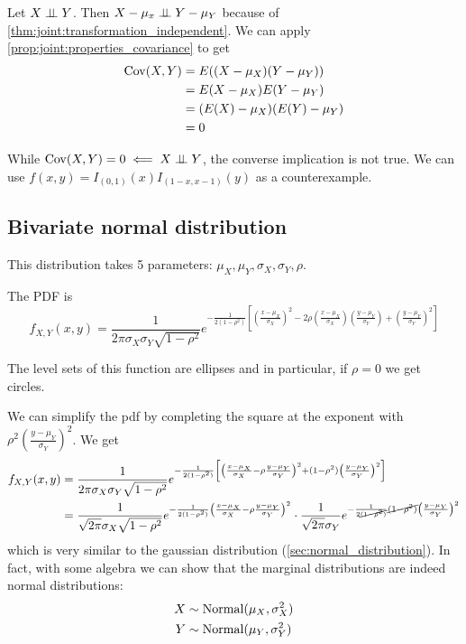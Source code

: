 \documentclass[12pt]{extarticle}
\newcommand{\cov}{{\operatorfont Cov}}
\newcommand{\Normal}{{\operatorfont Normal}}
\begin{document}
\begin{proposition}
    Let $X \perp \!\!\! \perp Y$. Then $X - \mu_x \perp \!\!\! \perp Y -\mu_Y$ because of \autoref{thm:joint:transformation_independent}.
    We can apply \autoref{prop:joint:properties_covariance} to get
    \begin{align}
        \cov(X, Y) & = E((X - \mu_X)(Y - \mu_Y))    \\
                   & = E(X - \mu_X) E(Y - \mu_Y)    \\
                   & = (E(X) - \mu_X)(E(Y) - \mu_Y) \\
                   & = 0
    \end{align}
\end{proposition}

\begin{remark}
    While $\cov(X, Y) = 0 \impliedby X \indep Y$, the converse implication is not true.
    We can use $f(x, y) = I_{(0,1)}(x) I_{(1-x, x-1)}(y)$ as a counterexample.
\end{remark}

\subsection{Bivariate normal distribution}

This distribution takes 5 parameters: $\mu_X, \mu_Y, \sigma_X, \sigma_Y, \rho$.

The PDF is
\begin{equation}
    f_{X,Y}(x,y) = \frac{1}{2 \pi \sigma_X \sigma_Y \sqrt{1- \rho^2}} e^{-\frac{1}{2(1-\rho^2)} \left[ \left( \frac{x - \mu_X}{\sigma_X} \right)^2 -2 \rho \left( \frac{x-\mu_X}{\sigma_X} \right) \left( \frac{y-\mu_Y}{\sigma_Y} \right) + \left(\frac{y-\mu_Y}{\sigma_Y}\right)^2 \right]}
\end{equation}

The level sets of this function are ellipses and in particular, if $\rho = 0$ we get circles.

We can simplify the pdf by completing the square at the exponent with $\rho ^2 \left(\frac{y - \mu_Y}{\sigma_Y}\right)^2$. We get
\begin{align}
    f_{X,Y}(x,y) & = \frac{1}{2 \pi \sigma_X \sigma_Y \sqrt{1- \rho^2}} e^{-\frac{1}{2(1-\rho^2)} \left[ \left( \frac{x - \mu_X}{\sigma_X} - \rho \frac{y-\mu_Y}{\sigma_Y} \right)^2 + (1 - \rho^2) \left(\frac{y-\mu_Y}{\sigma_Y}\right)^2 \right]} \\
                 & = \frac{1}{\sqrt{2 \pi} \sigma_X \sqrt{1- \rho^2}} e^{-\frac{1}{2(1-\rho^2)} \left( \frac{x - \mu_X}{\sigma_X} - \rho \frac{y-\mu_Y}{\sigma_Y} \right)^2} \cdot
    \frac{1}{\sqrt{2 \pi} \sigma_Y} e^{-\frac{1}{2\cancel{(1-\rho^2)}} \cancel{(1 - \rho^2)} \left(\frac{y-\mu_Y}{\sigma_Y}\right)^2}
\end{align}
which is very similar to the gaussian distribution (\autoref{sec:normal_distribution}).
In fact, with some algebra we can show that the marginal distributions are indeed normal distributions:
\begin{align}
    X & \sim \Normal(\mu_X, \sigma_X^2) \\
    Y & \sim \Normal(\mu_Y, \sigma_Y^2)
\end{align}
\end{document}
